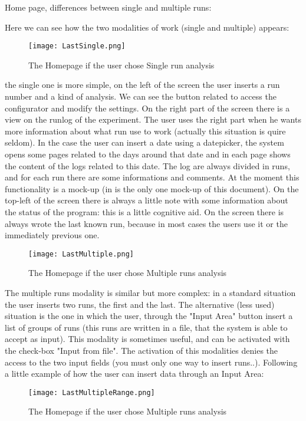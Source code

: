 Home page, differences between single and multiple runs:

Here we can see how the two modalities of work (single and multiple) appears: 
\begin{figure}[H]
\centering
\texttt{[image: LastSingle.png]} 
\caption{The Homepage if the user chose Single run analysis}
\end{figure}

the single one is more simple, on the left of the screen the user inserts a run number and a kind of analysis. We can see the button related to access the configurator and modify the settings. On the right part of the screen there is a view on the runlog of the experiment. The user uses the right part when he wants more information about what run use to work (actually this situation is quire seldom). In the case the user can insert a date using a datepicker, the system opens some pages related to the days around that date and in each page shows the content of the logs related to this date. The log are always divided in runs, and for each run there are some informations and comments. At the moment this functionality is a mock-up (in is the only one mock-up of this document). On the  top-left of the screen there is always a little note with some information about the status of the program: this is a little cognitive aid. On the screen there is always wrote the last known run, because in most cases the users use it or the immediately previous one. 


\begin{figure}[H]
\centering
\texttt{[image: LastMultiple.png]} 
\caption{The Homepage if the user chose Multiple runs analysis}
\end{figure}    

The multiple runs modality is similar but more complex: in a standard situation the user inserts two runs, the first and the last. The alternative (less used) situation is the one in which the user, through the "Input Area" button insert a  list of groups of runs (this runs are written in a file, that the system is able to accept as input). This modality is sometimes useful, and can be activated with the check-box "Input from file". The activation of this modalities denies the access to the two input fields (you must only one way to insert runs..).
Following a little example of how the user can insert data through an Input Area:

\begin{figure}[H]
\centering
\texttt{[image: LastMultipleRange.png]} 
\caption{The Homepage if the user chose Multiple runs analysis}
\end{figure}   


